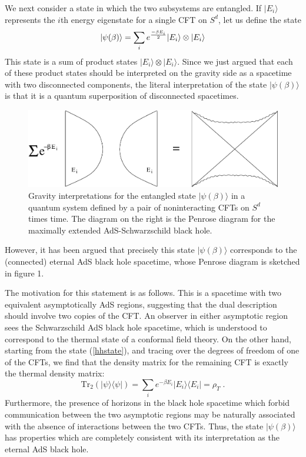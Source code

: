 \documentclass[12pt,epsf]{article}
\newcommand{\be}{\begin{equation}}
\newcommand{\ee}{\end{equation}}
\renewcommand{\(}{\left(}
\renewcommand{\)}{\right)}
\newcommand{\tr}{\mathrm{Tr}}
\begin{document}
We next consider a state in which the two subsystems are entangled. If $| E_i \rangle$ represents the $i$th energy eigenstate for a single CFT on $S^d$, let us define the state
\be
\label{hhstate}
|\psi (\beta) \rangle = \sum_i e^{- \beta E_i \over 2} | E_i \rangle \otimes | E_i \rangle
\ee
This state is a sum of product states $| E_i \rangle \otimes | E_i \rangle$. Since we just argued that each of these product states should be interpreted on the gravity side as a spacetime with two disconnected components, the literal interpretation of the state $|\psi (\beta) \rangle$ is that it is a quantum superposition of disconnected spacetimes.
\begin{figure}
\centering
\includegraphics[width=\textwidth]{disjoint.eps}
\caption{Gravity interpretations for the entangled state $|\psi (\beta) \rangle$ in a quantum system defined by a pair of noninteracting CFTs on $S^d$ times time. The diagram on the right is the Penrose diagram for the maximally extended AdS-Schwarzschild black hole. }
\end{figure}
However, it has been argued \cite{eads,hm,bklt} that precisely this state $|\psi (\beta) \rangle$ corresponds to the (connected) eternal AdS black hole spacetime, whose Penrose diagram is sketched in figure 1.

The motivation for this statement is as follows. This is a spacetime with two equivalent asymptotically AdS regions, suggesting that the dual description should involve two copies of the CFT. An observer in either asymptotic region sees the Schwarzschild AdS black hole spacetime, which is understood \cite{wittenthermal} to correspond to the thermal state of a conformal field theory. On the other hand, starting from the state (\ref{hhstate}), and tracing over the degrees of freedom of one of the CFTs, we find that the density matrix for the remaining CFT is exactly the thermal density matrix:
\[
\tr_2(|\psi \rangle \langle \psi |) = \sum_i e^{- \beta E_i } | E_i \rangle \langle E_i | = \rho_T \; .
\]
Furthermore, the presence of horizons in the black hole spacetime which forbid communication between the two asymptotic regions may be naturally associated with the absence of interactions between the two CFTs. Thus, the state $|\psi (\beta) \rangle$ has properties which are completely consistent with its interpretation as the eternal AdS black hole.
\end{document}
